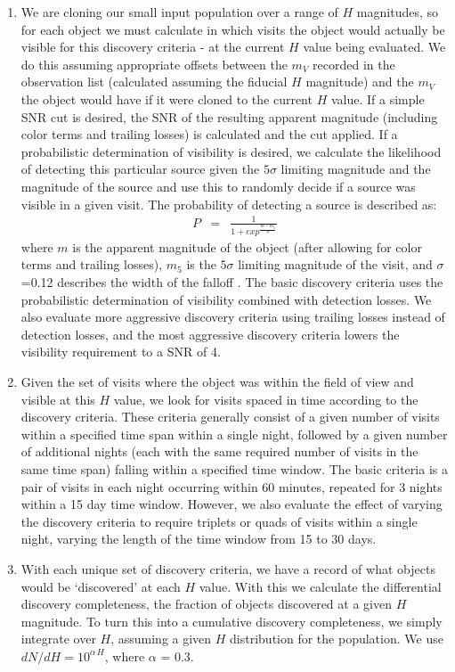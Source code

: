 \begin{enumerate}
\item We are cloning our small input population over a range of $H$ magnitudes, so for each object we must calculate in which visits the object would actually be visible for this discovery criteria - at the current $H$ value being evaluated. We do this assuming appropriate offsets between the $m_V$ recorded in the observation list (calculated assuming the fiducial $H$ magnitude) and the $m_V$ the object would have if it were cloned to the current $H$ value. If a simple SNR cut is desired, the SNR of the resulting apparent magnitude (including color terms and trailing losses) is calculated and the cut applied. If a probabilistic determination of visibility is desired, we calculate the likelihood of detecting this particular source given the $5\sigma$ limiting magnitude and the magnitude of the source and use this to randomly decide if a source was visible in a given visit. The probability of detecting a source is described as:
\begin{eqnarray}
P & = & \frac {1}  {1 +  exp^\frac {m -  m_5}{\sigma}}
\end{eqnarray}
where $m$ is the apparent magnitude of the object (after allowing for color terms and trailing losses),  $m_5$ is the $5\sigma$ limiting magnitude of the visit, and $\sigma$=0.12 describes the width of the falloff \citep{2014ApJ...794..120A}. The basic discovery criteria uses the probabilistic determination of visibility combined with detection losses. We also evaluate more aggressive discovery criteria using trailing losses instead of detection losses, and the most aggressive discovery criteria lowers the visibility requirement to a SNR of 4.

\item Given the set of visits where the object was within the field of view and visible at this $H$ value, we look for visits spaced in time according to the discovery criteria. These criteria generally consist of a given number of visits within a specified time span within a single night, followed by a given number of additional nights (each with the same required number of visits in the same time span) falling within a specified time window. The basic criteria is a pair of visits in each night occurring within 60 minutes, repeated for 3 nights within a 15 day time window. However, we also evaluate the effect of varying the discovery criteria to require triplets or quads of visits within a single night, varying the length of the time window from 15 to 30 days.

\item With each unique set of discovery criteria, we have a record of what objects would be `discovered' at each $H$ value. With this we calculate the differential discovery completeness, the fraction of objects discovered at a given $H$ magnitude. To turn this into a cumulative discovery completeness, we simply integrate over $H$, assuming a given $H$ distribution for the population. We use $dN/dH = 10^{\alpha\, H}$, where $\alpha$ = 0.3.

\end{enumerate}



